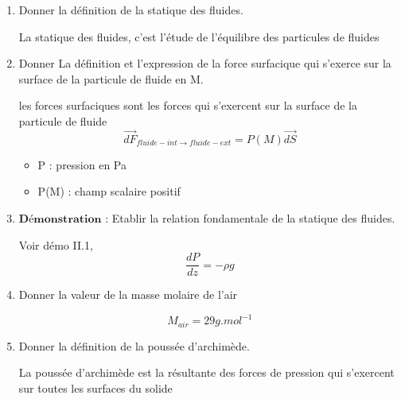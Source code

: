 \documentclass{article}
\begin{document}
\begin{enumerate}[label=\arabic{enumi} - , left=0pt, itemsep=1em]
    \item Donner la définition de la statique des fluides. \par
    \begin{solution}
     La statique des fluides, c'est l'étude de l'équilibre des particules de fluides 
    \end{solution}

    \item Donner La définition et l'expression de la force surfacique qui s'exerce sur la surface de la particule de fluide en M. \par
    \begin{solution}
     les forces surfaciques sont les forces qui s'exercent sur la surface de la particule de fluide
          \[ \overrightarrow{dF}_{fluide-int \to fluide-ext} = P(M) \vec{dS}\]
         
          \begin{itemize}
               \tiny\item   P : pression en Pa
               \tiny\item   P(M) : champ scalaire positif
           \end{itemize}  
     \end{solution}

     \item $\textbf{Démonstration :}$ Etablir la relation fondamentale de la statique des fluides.\par
           \begin{solution}
               Voir démo II.1, \[ \frac{dP}{dz}=-\rho g \]
       
           \end{solution}
     
     \item Donner la valeur de la masse molaire de l'air\par
           \begin{solution}
               \[ M_{air} = 29 g.mol^{-1} \]
       
           \end{solution}
     
    \item Donner la définition de la poussée d'archimède. \par
    \begin{solution}
        La poussée d'archimède est la résultante des forces de pression qui s'exercent sur toutes les surfaces du solide 
     \end{solution}


\end{enumerate}
\end{document}
